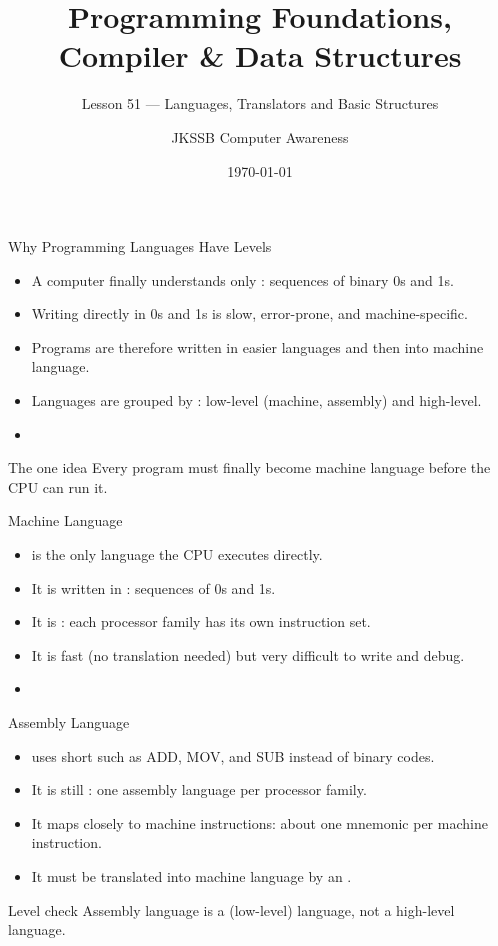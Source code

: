 \documentclass[aspectratio=169]{beamer}
\title{Programming Foundations, Compiler \& Data Structures}
\subtitle{Lesson 51 --- Languages, Translators and Basic Structures}
\author{JKSSB Computer Awareness}
\date{\today}
\begin{document}
\frame{\titlepage}

\begin{frame}{Why Programming Languages Have Levels}
  \begin{itemize}
    \item A computer finally understands only :
      sequences of binary 0s and 1s.
    \item Writing directly in 0s and 1s is slow, error-prone, and
      machine-specific.
    \item Programs are therefore written in easier languages and then
       into machine language.
    \item Languages are grouped by : low-level (machine,
      assembly) and high-level.
    \item {}
  \end{itemize}
  \begin{block}{The one idea}
    Every program must finally become machine language before the CPU can
    run it.
  \end{block}
\end{frame}

\begin{frame}{Machine Language}
  \begin{itemize}
    \item {} is the only language the CPU executes
      directly.
    \item It is written in : sequences of 0s and 1s.
    \item It is : each processor family has its own
      instruction set.
    \item It is fast (no translation needed) but very difficult to write
      and debug.
    \item {}
  \end{itemize}
\end{frame}

\begin{frame}{Assembly Language}
  \begin{itemize}
    \item {} uses short  such as ADD,
      MOV, and SUB instead of binary codes.
    \item It is still : one assembly language per
      processor family.
    \item It maps closely to machine instructions: about one mnemonic per
      machine instruction.
    \item It must be translated into machine language by an
      .
  \end{itemize}
  \begin{alertblock}{Level check}
    Assembly language is a  (low-level) language,
    not a high-level language.
  \end{alertblock}
\end{frame}
\end{document}
